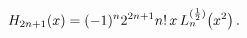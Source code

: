 \[\mathop{H_{2n+1}\/}\nolimits\!\left(x\right)=(-1)^{n}2^{2n+1}n!\,x\mathop{L^{(%
\frac{1}{2})}_{n}\/}\nolimits\!\left(x^{2}\right).\]